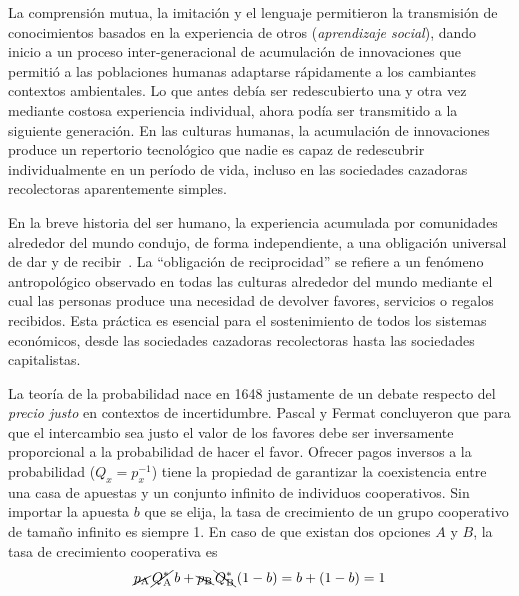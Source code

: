 \documentclass[a4paper,11pt]{book}
\theoremstyle{definition}
\begin{document}

La comprensi\'on mutua, la imitaci\'on y el lenguaje permitieron la transmisi\'on de conocimientos basados en la experiencia de otros (\emph{aprendizaje social}), dando inicio a un proceso inter-generacional de acumulación de innovaciones que permiti\'o a las poblaciones humanas adaptarse r\'apidamente a los cambiantes contextos ambientales.
%
Lo que antes debía ser redescubierto una y otra vez mediante costosa experiencia individual, ahora podía ser transmitido a la siguiente generación.
%
En las culturas humanas, la acumulación de innovaciones produce un repertorio tecnológico que nadie es capaz de redescubrir individualmente en un período de vida, incluso en las sociedades cazadoras recolectoras aparentemente simples.


En la breve historia del ser humano, la experiencia acumulada por comunidades alrededor del mundo condujo, de forma independiente, a una obligación universal de dar y de recibir~\cite{mauss1923-leDon}.
%
La ``obligación de reciprocidad'' se refiere a un fenómeno antropológico observado en todas las culturas alrededor del mundo mediante el cual las personas produce una necesidad de devolver favores, servicios o regalos recibidos.
%
Esta práctica es esencial para el sostenimiento de todos los sistemas económicos, desde las sociedades cazadoras recolectoras hasta las sociedades capitalistas.


La teor\'ia de la probabilidad nace en 1648 justamente de un debate respecto del \emph{precio justo} en contextos de incertidumbre.
%
Pascal y Fermat concluyeron que para que el intercambio sea justo el valor de los favores debe ser inversamente proporcional a la probabilidad de hacer el favor.
%
Ofrecer pagos inversos a la probabilidad ($Q_x = p_x^{-1}$) tiene la propiedad de garantizar la coexistencia entre una casa de apuestas y un conjunto infinito de individuos cooperativos.
%
Sin importar la apuesta $b$ que se elija, la tasa de crecimiento de un grupo cooperativo de tamaño infinito es siempre 1.
%
En caso de que existan dos opciones $A$ y $B$, la tasa de crecimiento cooperativa es
\begin{equation}
\cancel{p_{\text{A}}} \,  \cancel{Q^*_{\text{A}}} \, b + \bcancel{p_{\text{B}}} \, \bcancel{Q^*_{\text{B}}}  \, (1-b) = b + (1-b)  = 1
\end{equation}
\end{document}
